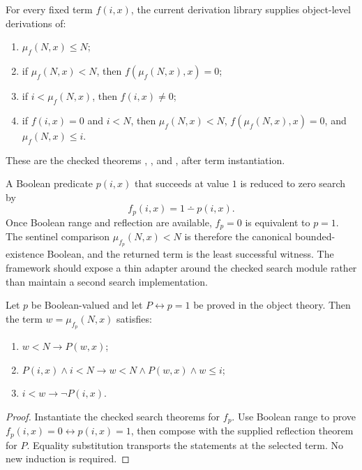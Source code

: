 \begin{theorem}\label{thm:least-search}
For every fixed term \(f(i,x)\), the current derivation library supplies object-level derivations of:
\begin{enumerate}[label=(\alph*)]
  \item \(\mu_f(N,x)\le N\);
  \item if \(\mu_f(N,x)<N\), then \(f(\mu_f(N,x),x)=0\);
  \item if \(i<\mu_f(N,x)\), then \(f(i,x)\ne0\);
  \item if \(f(i,x)=0\) and \(i<N\), then \(\mu_f(N,x)<N\), \(f(\mu_f(N,x),x)=0\), and \(\mu_f(N,x)\le i\).
\end{enumerate}
These are the checked theorems
, , and
, after term instantiation.
\end{theorem}

A Boolean predicate \(p(i,x)\) that succeeds at value \(1\) is reduced to zero search by
\[
  f_p(i,x)=1\mathbin{\dotminus}p(i,x).
\]
Once Boolean range and reflection are available, \(f_p=0\) is equivalent to \(p=1\).  The sentinel comparison \(\mu_{f_p}(N,x)<N\) is therefore the canonical bounded-existence Boolean, and the returned term is the least successful witness.  The framework should expose a thin adapter around the checked search module rather than maintain a second search implementation.

\begin{corollary}\label{cor:bounded-witness-adapter}
Let \(p\) be Boolean-valued and let \(P\leftrightarrow p=1\) be proved in the object theory.  Then the term \(w=\mu_{f_p}(N,x)\) satisfies:
\begin{enumerate}[label=(\roman*)]
  \item \(w<N\to P(w,x)\);
  \item \(P(i,x)\wedge i<N\to w<N\wedge P(w,x)\wedge w\le i\);
  \item \(i<w\to\neg P(i,x)\).
\end{enumerate}
\end{corollary}

\begin{proof}
Instantiate the checked search theorems for \(f_p\).  Use Boolean range to prove \(f_p(i,x)=0\leftrightarrow p(i,x)=1\), then compose with the supplied reflection theorem for \(P\).  Equality substitution transports the statements at the selected term.  No new induction is required.
\end{proof}

